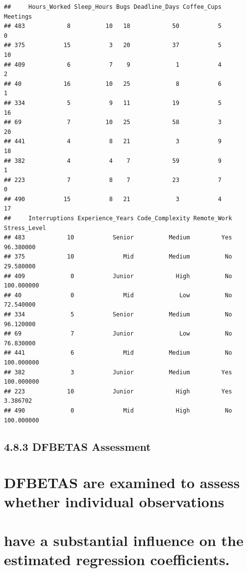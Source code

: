 \documentclass[
]{article}
\begin{document}
\begin{verbatim}
##     Hours_Worked Sleep_Hours Bugs Deadline_Days Coffee_Cups Meetings
## 483            8          10   18            50           5        0
## 375           15           3   20            37           5       10
## 409            6           7    9             1           4        2
## 40            16          10   25             8           6        1
## 334            5           9   11            19           5       16
## 69             7          10   25            58           3       20
## 441            4           8   21             3           9       18
## 382            4           4    7            59           9        1
## 223            7           8    7            23           7        0
## 490           15           8   21             3           4       17
##     Interruptions Experience_Years Code_Complexity Remote_Work Stress_Level
## 483            10           Senior          Medium         Yes    96.380000
## 375            10              Mid          Medium          No    29.580000
## 409             0           Junior            High          No   100.000000
## 40              0              Mid             Low          No    72.540000
## 334             5           Senior          Medium          No    96.120000
## 69              7           Junior             Low          No    76.830000
## 441             6              Mid          Medium          No   100.000000
## 382             3           Junior          Medium         Yes   100.000000
## 223            10           Junior            High         Yes     3.386702
## 490             0              Mid            High          No   100.000000
\end{verbatim}

\subsection{4.8.3 DFBETAS Assessment}\label{dfbetas-assessment}

\section{DFBETAS are examined to assess whether individual
observations}\label{dfbetas-are-examined-to-assess-whether-individual-observations}

\section{have a substantial influence on the estimated regression
coefficients.}\label{have-a-substantial-influence-on-the-estimated-regression-coefficients.}
\end{document}
